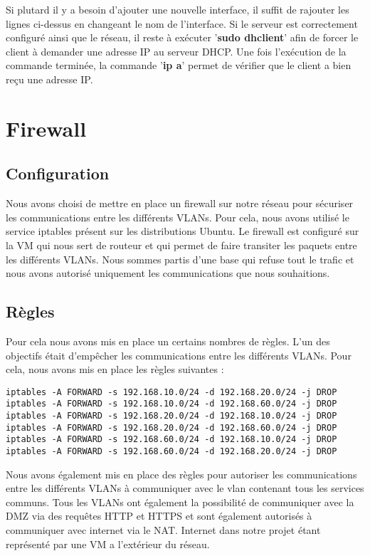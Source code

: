 \documentclass[a4paper,12pt]{report}
\begin{document}
\begin{itemize}
            Si plutard il y a besoin d'ajouter une nouvelle interface, il suffit de rajouter les lignes ci-dessus en changeant le nom de l'interface.
            Si le serveur est correctement configuré ainsi que le réseau, il reste à exécuter '\textbf{sudo dhclient}' afin de forcer le client à demander une adresse IP au serveur DHCP.
            Une fois l'exécution de la commande terminée, la commande '\textbf{ip a}' permet de vérifier que le client a bien reçu une adresse IP.

        \section{Firewall}
            \subsection{Configuration}
            Nous avons choisi de mettre en place un firewall sur notre réseau pour sécuriser les communications entre les différents VLANs. Pour cela, nous avons utilisé le service iptables présent sur les distributions Ubuntu.
            Le firewall est configuré sur la VM qui nous sert de routeur et qui permet de faire transiter les paquets entre les différents VLANs. Nous sommes partis d'une base qui refuse tout le trafic et nous avons autorisé uniquement les communications que nous souhaitions.

            \subsection{Règles}
            Pour cela nous avons mis en place un certains nombres de règles. L'un des objectifs était d'empêcher les communications entre les différents VLANs. Pour cela, nous avons mis en place les règles suivantes :
            \begin{verbatim}
iptables -A FORWARD -s 192.168.10.0/24 -d 192.168.20.0/24 -j DROP
iptables -A FORWARD -s 192.168.10.0/24 -d 192.168.60.0/24 -j DROP
iptables -A FORWARD -s 192.168.20.0/24 -d 192.168.10.0/24 -j DROP
iptables -A FORWARD -s 192.168.20.0/24 -d 192.168.60.0/24 -j DROP
iptables -A FORWARD -s 192.168.60.0/24 -d 192.168.10.0/24 -j DROP
iptables -A FORWARD -s 192.168.60.0/24 -d 192.168.20.0/24 -j DROP
            \end{verbatim}
            Nous avons également mis en place des règles pour autoriser les communications entre les différents VLANs à communiquer avec le vlan contenant tous les services communs. Tous les VLANs ont également la possibilité de communiquer avec la DMZ via des requêtes HTTP et HTTPS et sont également autorisés à communiquer avec internet via le NAT. Internet dans notre projet étant représenté par une VM a l'extérieur du réseau. 


\end{itemize}
\end{document}
